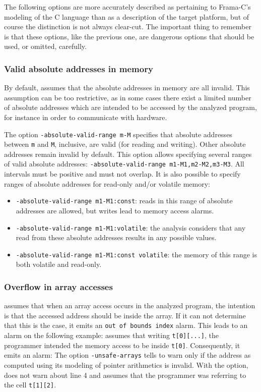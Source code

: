 \documentclass{frama-c-book}
\begin{document}
The following options are more accurately described as
pertaining to Frama-C's modeling of the C language
than as a description of the target platform, but of course
the distinction is not always clear-cut. The important thing to remember
is that these options, like the previous one, are dangerous options
that should be used, or omitted, carefully.

\subsubsection{Valid absolute addresses in memory}

By default, \Eva{} assumes that the absolute addresses in
memory are all invalid. This assumption can be too restrictive,
as in some cases there exist a limited number of absolute
addresses which are intended to be accessed by the analyzed program,
for instance in order to communicate with hardware.

The option \lstinline|-absolute-valid-range m-M| specifies that
absolute addresses between \lstinline$m$ and \lstinline$M$, inclusive,
are valid (for reading and writing). Other absolute addresses remain
invalid by default.
This option allows specifying several ranges of valid absolute addresses:
\lstinline|-absolute-valid-range m1-M1,m2-M2,m3-M3|.
All intervals must be positive and must not overlap.
It is also possible to specify ranges of absolute addresses for read-only
and/or volatile memory:
\begin{itemize}
\item \lstinline|-absolute-valid-range m1-M1:const|:
  reads in this range of absolute addresses are allowed,
  but writes lead to memory access alarms.
\item \lstinline|-absolute-valid-range m1-M1:volatile|:
  the analysis considers that any read from these absolute addresses
  results in any possible values.
\item \lstinline|-absolute-valid-range m1-M1:const volatile|:
  the memory of this range is both volatile and read-only.
\end{itemize}

\subsubsection{Overflow in array accesses}
\label{unsafe-arrays}

\Eva{} assumes that when an array
access occurs in the analyzed program, the intention is that the
accessed address should be inside the array. If it can not determine that
this is the case, it emits an \lstinline|out of bounds index|
alarm. This leads to an alarm on the following example:
\Eva{} assumes that writing \lstinline|t[0][...]|, the programmer
intended the memory access to be inside \lstinline|t[0]|. Consequently,
it emits an alarm:
The option \lstinline|-unsafe-arrays| tells \Eva{} to warn
only if the address as computed using its modeling of pointer arithmetics
is invalid. With the option, \Eva{} does not warn about line 4
and assumes that the programmer
was referring to the cell \lstinline|t[1][2]|.
\end{document}
